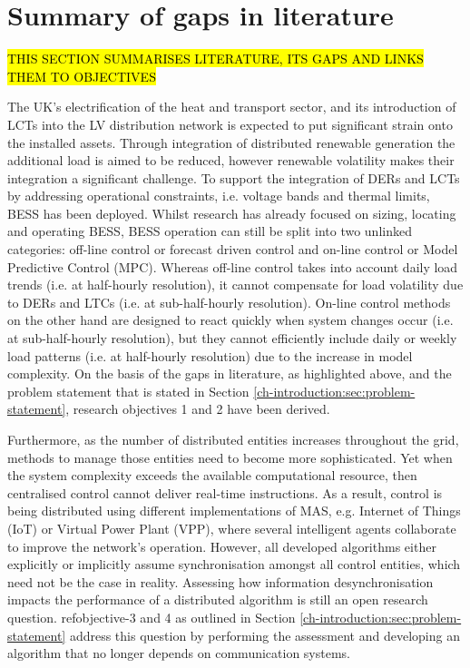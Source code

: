 \section{Summary of gaps in literature}
\label{ch-literature:sec:literature-gaps}

\hl{THIS SECTION SUMMARISES LITERATURE, ITS GAPS AND LINKS THEM TO OBJECTIVES}

The UK's electrification of the heat and transport sector, and its introduction of LCTs into the LV distribution network is expected to put significant strain onto the installed assets.
Through integration of distributed renewable generation the additional load is aimed to be reduced, however renewable volatility makes their integration a significant challenge.
To support the integration of DERs and LCTs by addressing operational constraints, i.e. voltage bands and thermal limits, BESS has been deployed.
Whilst research has already focused on sizing, locating and operating BESS, BESS operation can still be split into two unlinked categories: off-line control or forecast driven control and on-line control or Model Predictive Control (MPC).
Whereas off-line control takes into account daily load trends (i.e. at half-hourly resolution), it cannot compensate for load volatility due to DERs and LTCs (i.e. at sub-half-hourly resolution).
On-line control methods on the other hand are designed to react quickly when system changes occur (i.e. at sub-half-hourly resolution), but they cannot efficiently include daily or weekly load patterns (i.e. at half-hourly resolution) due to the increase in model complexity.
On the basis of the gaps in literature, as highlighted above, and the problem statement that is stated in Section \ref{ch-introduction:sec:problem-statement}, research objectives 1 and 2 have been derived.

Furthermore, as the number of distributed entities increases throughout the grid, methods to manage those entities need to become more sophisticated.
Yet when the system complexity exceeds the available computational resource, then centralised control cannot deliver real-time instructions.
As a result, control is being distributed using different implementations of MAS, e.g. Internet of Things (IoT) or Virtual Power Plant (VPP), where several intelligent agents collaborate to improve the network's operation.
However, all developed algorithms either explicitly or implicitly assume synchronisation amongst all control entities, which need not be the case in reality.
Assessing how information desynchronisation impacts the performance of a distributed algorithm is still an open research question.
ref{objective-3} and 4 as outlined in Section \ref{ch-introduction:sec:problem-statement} address this question by performing the assessment and developing an algorithm that no longer depends on communication systems.

